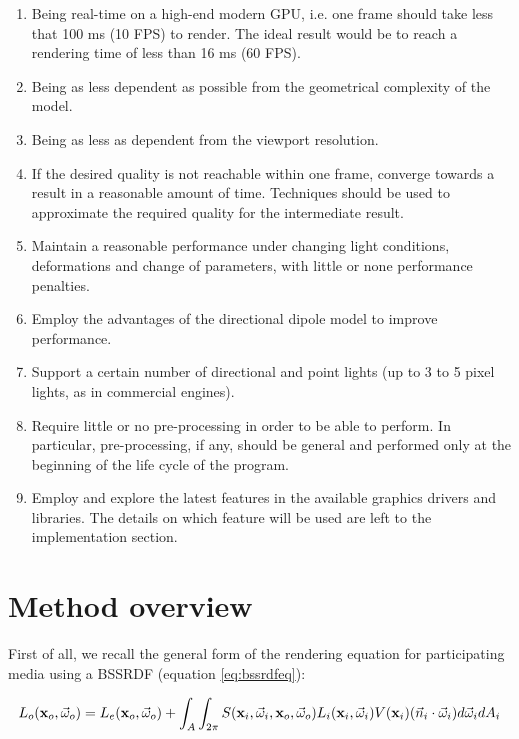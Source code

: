 \begin{enumerate}
	\item Being real-time on a high-end modern GPU, i.e. one frame should take less that 100 ms (10 FPS) to render. The ideal result would be to reach a rendering time of less than 16 ms (60 FPS).
	\item Being as less dependent as possible from the geometrical complexity of the model.
	\item Being as less as dependent from the viewport resolution.
	\item If the desired quality is not reachable within one frame, converge towards a result in a reasonable amount of time. Techniques should be used to approximate the required quality for the intermediate result. 
	\item Maintain a reasonable performance under changing light conditions, deformations and change of parameters, with little or none performance penalties.
	\item Employ the advantages of the directional dipole model to improve performance.
	\item Support a certain number of directional and point lights (up to 3 to 5 pixel lights, as in commercial engines\citep{unitymanual}).
	\item Require little or no pre-processing in order to be able to perform. In particular, pre-processing, if any, should be general and performed only at the beginning of the life cycle of the program. 
	\item Employ and explore the latest features in the available graphics drivers and libraries. The details on which feature will be used are left to the implementation section.
\end{enumerate}

\section{Method overview}

First of all, we recall the general form of the rendering equation for participating media using a BSSRDF (equation \ref{eq:bssrdfeq}):

\begin{equation*}
L_o(\mathbf{x}_o,\vec{\omega}_o) = L_e(\mathbf{x}_o,\vec{\omega}_o) + \int_A \int_{2\pi} S(\mathbf{x}_i, \vec{\omega}_i, \mathbf{x}_o, \vec{\omega}_o) L_i(\mathbf{x}_i,\vec{\omega}_i) V(\mathbf{x}_i) (\vec{n}_i \cdot \vec{\omega}_i) d\vec{\omega}_i d A_i
\end{equation*}

